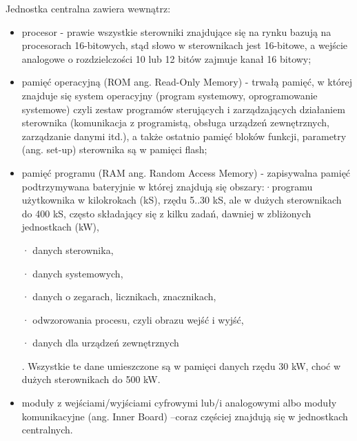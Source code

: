 \documentclass{article}
\begin{document}
	Jednostka centralna zawiera wewnątrz:
	
	\begin{itemize}
		
	\item procesor - prawie wszystkie sterowniki znajdujące się na rynku bazują na procesorach 16-bitowych, stąd słowo w sterownikach jest 16-bitowe, a wejście analogowe o rozdzielczości 10 lub 12 bitów zajmuje kanał 16 bitowy;
	
	\item pamięć operacyjną (ROM ang. Read-Only Memory) - trwałą pamięć, w której znajduje się system operacyjny (program systemowy, oprogramowanie systemowe) czyli zestaw programów sterujących i zarządzających działaniem sterownika (komunikacja z programistą, obsługa urządzeń zewnętrznych, zarządzanie danymi itd.), a także ostatnio pamięć bloków funkcji, parametry (ang. set-up) sterownika są w pamięci flash;
	
	\item pamięć programu (RAM ang. Random Access Memory) - zapisywalna pamięć podtrzymywana bateryjnie w której znajdują się obszary:·programu użytkownika w kilokrokach (kS), rzędu 5..30 kS, ale w dużych sterownikach do 400 kS, często składający się z kilku zadań, dawniej w zbliżonych jednostkach (kW),
	
	· danych sterownika,
	
	· danych systemowych,
	
	· danych o zegarach, licznikach, znacznikach,
	
	· odwzorowania procesu, czyli obrazu wejść i wyjść,
	
	· danych dla urządzeń zewnętrznych
	
	. Wszystkie te dane umieszczone są w pamięci danych rzędu 30 kW, choć w dużych sterownikach do 500 kW.
	
	\item moduły z wejściami/wyjściami cyfrowymi lub/i analogowymi albo moduły komunikacyjne (ang. Inner Board) –coraz częściej znajdują się w jednostkach centralnych.
	
	\end{itemize}
	
\label{LastPage}
\end{document}
